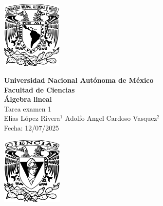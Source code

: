 \documentclass[11pt,letterpaper]{article}
\begin{document}
\makeatletter
        \renewenvironment{proof}[1][\proofname]{\par
            \pushQED{\qed}%
            \normalfont \topsep6\p@\@plus6\p@\relax
            \trivlist
            \item\relax
            {\itshape
            #1\@addpunct{.}}\par\vspace{\baselineskip}\ignorespaces
            }{%
            \popQED\endtrivlist\@endpefalse
            }
\makeatother

\begin{center}
    \begin{minipage}{3cm}
    	\begin{center}
    		\includegraphics[height=3.4cm]{logo_unam.png}
    	\end{center}
    \end{minipage}\hfill
    \begin{minipage}{10cm}
    	\begin{center}
    	\textbf{\large Universidad Nacional Autónoma de México}\\[0.1cm]
        \textbf{Facultad de Ciencias}\\[0.1cm]
        \textbf{\'Algebra lineal}\\[0.1cm]
        Tarea examen 1 \\[0.1cm]
         El\'ias L\'opez Rivera$^{1}$\,\,Adolfo Angel Cardoso Vasquez$^{2}$\\[0.1cm]
        Fecha:\,\,12/07/2025
    	\end{center}
    \end{minipage}\hfill
    \begin{minipage}{3cm}
    	\begin{center}
    		\includegraphics[height=3.4cm]{Logo_FC.png}
    	\end{center}
    \end{minipage}
\end{center}
\end{document}

